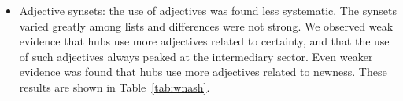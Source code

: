\begin{itemize}
																																																																																																																																																																																																																																																																																																																																																															\FloatBarrier
																																																																																																																																																																																																																																																																																																																																																																\item Adjective synsets: the use of adjectives was found less systematic.
																																																																																																																																																																																																																																																																																																																																																																		The synsets varied greatly among lists and differences were not strong.
																																																																																																																																																																																																																																																																																																																																																																				We observed weak evidence that hubs use more adjectives related to certainty,
																																																																																																																																																																																																																																																																																																																																																																						and that the use of such adjectives always peaked at the intermediary sector.
																																																																																																																																																																																																																																																																																																																																																																								Even weaker evidence was found that hubs use more adjectives related to newness.
																																																																																																																																																																																																																																																																																																																																																																										These results are shown in Table~\ref{tab:wnash}.

\end{itemize}
